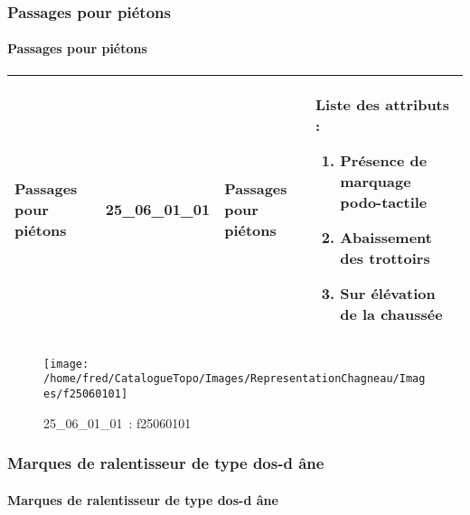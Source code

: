 \documentclass[12pt,titlepage]{book}
\begin{document}
\subsubsection{\large Passages pour piétons}
\paragraph{Passages pour piétons}
\noindent
\vspace{\baselineskip}

\renewcommand{\arraystretch}{1.2}
\begin{supertabular}{|p{10cm}|c|p{13cm}|p{12cm}|}
 Passages pour piétons & 25\_06\_01\_01 & Passages pour piétons & Liste des attributs :
\begin{enumerate}
  \item Présence de marquage podo-tactile  \item Abaissement des trottoirs  \item Sur élévation de la chaussée\end{enumerate}
\\
\hline
\end{supertabular}
\begin{figure}[h!]
  \hfill         %
  \begin{minipage}[t]{3cm}
    \begin{center}
      \texttt{[image: /home/fred/CatalogueTopo/Images/RepresentationChagneau/Images/f25060101]}
      \caption[~25\_06\_01\_01]{\small{25\_06\_01\_01~:} \tiny{f25060101}}\label{f25060101}
    \end{center}
  \end{minipage}
\end{figure}

\subsubsection{\large Marques de ralentisseur de type dos-d âne}
\paragraph{Marques de ralentisseur de type dos-d âne}
\noindent
\vspace{\baselineskip}
\end{document}
